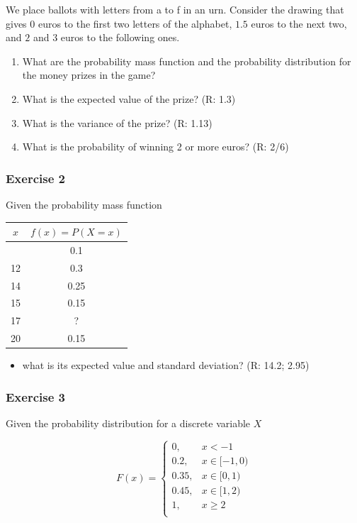 \documentclass[
]{book}
\providecommand{\tightlist}{%
  \setlength{\itemsep}{0pt}\setlength{\parskip}{0pt}}
\begin{document}
We place ballots with letters from a to f in an urn. Consider the drawing that gives \(0\) euros to the first two letters of the alphabet, \(1.5\) euros to the next two, and \(2\) and \(3\) euros to the following ones.

\begin{enumerate}
\def\labelenumi{\alph{enumi})}
\item
  What are the probability mass function and the probability distribution for the money prizes in the game?
\item
  What is the expected value of the prize? (R: 1.3)
\item
  What is the variance of the prize? (R: 1.13)
\item
  What is the probability of winning 2 or more euros? (R: 2/6)
\end{enumerate}

\hypertarget{exercise-2-2}{%
\subsubsection{Exercise 2}\label{exercise-2-2}}

Given the probability mass function

\begin{longtable}[]{@{}cc@{}}
\toprule\noalign{}
\(x\) & \(f(x)=P(X=x)\) \\
\midrule\noalign{}
\endhead
\bottomrule\noalign{}
\endlastfoot
10 & 0.1 \\
12 & 0.3 \\
14 & 0.25 \\
15 & 0.15 \\
17 & ? \\
20 & 0.15 \\
\end{longtable}

\begin{itemize}
\tightlist
\item
  what is its expected value and standard deviation? (R: 14.2; 2.95)
\end{itemize}

\hypertarget{exercise-3-2}{%
\subsubsection{Exercise 3}\label{exercise-3-2}}

Given the probability distribution for a discrete variable \(X\)

\[
    F(x)= 
\begin{cases}
0, & x < -1 \\
0.2,& x \in [-1,0)\\
0.35,& x \in [0,1)\\
0.45,& x \in [1,2)\\
1,& x \geq 2\\
\end{cases}
\]
\end{document}
